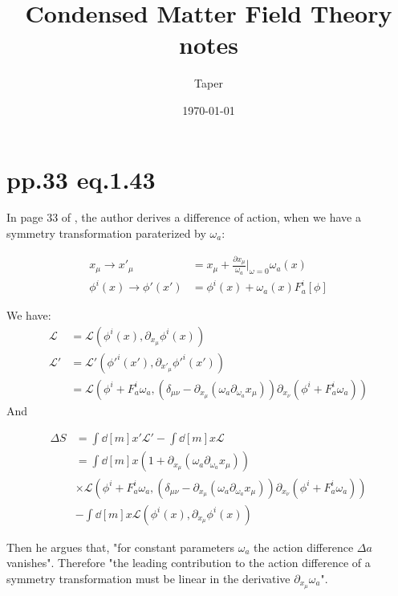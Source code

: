 \documentclass{article}
\title{Condensed Matter Field Theory notes}
\date{\today}
\author{Taper}
\begin{document}
\maketitle
{}
\tableofcontents

\section{pp.33 eq.1.43}
\label{sec:Table}

In page 33 of \cite{Altland2010a}, the author derives a difference of action, when we
have a symmetry transformation paraterized by $\omega_a$:

\begin{align}
    x_\mu \to x'_\mu &= x_\mu + \frac{\partial x_\mu}{\omega_a}|_{\omega=0} \omega_a(x) \\
    \phi^i(x) \to \phi'(x') &= \phi^i(x) + \omega_a(x)F^i_a[\phi]
\end{align}

We have:
\begin{align}
    \mathcal{L} &= \mathcal{L}(\phi^i(x),\partial_{x_\mu}\phi^i(x)) \\
    \mathcal{L}' &= \mathcal{L'}(\phi'^i(x'),\partial_{x'_\mu}\phi'^i(x')) \\
    &= \mathcal{L}\left(\phi^i+F^i_a\omega_a, 
                    \left(\delta_{\mu\nu}-\partial_{x_\mu}(\omega_a
                    \partial_{\omega_a}x_\mu)\right)
                    \partial_{x_\nu}(\phi^i+F^i_a\omega_a)
                  \right)
\end{align}
And 

\begin{align}
    \Delta S &= \int \dd[m]{x'} \mathcal{L}' - \int \dd[m]{x} \mathcal{L} 
    \label{eq:dS-integrand}\\
    &=
    \int \dd[m]{x}
    \left(1+\partial_{x_\mu}\left(\omega_a \partial_{\omega_a}x_\mu\right) \right) 
    \nonumber\\
    &\times \mathcal{L}\left(
                    \phi^i+F^i_a\omega_a, 
                    \left(\delta_{\mu\nu}-\partial_{x_\mu}\left(\omega_a
                        \partial_{\omega_a}x_\mu\right)\right)
                        \partial_{x_\nu}(\phi^i+F^i_a\omega_a)
                    \right) \nonumber\\
    &- \int \dd[m]{x}  \mathcal{L}(\phi^i(x),\partial_{x_\mu}\phi^i(x))
\end{align}

Then he argues that, "for constant parameters $\omega_a$ the action difference
$\Delta a$ vanishes". Therefore "the leading contribution to the action
difference of a symmetry transformation must be linear in the derivative
$\partial_{x_\mu}\omega_a$".
\end{document}
